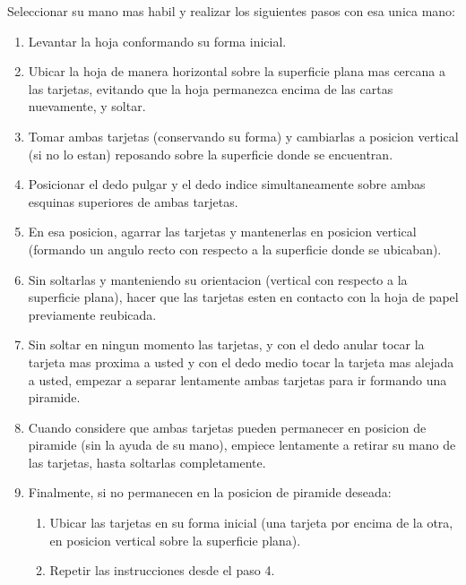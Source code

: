 \documentclass{article}
\begin{document}
Seleccionar su mano mas habil y realizar los siguientes pasos con esa unica mano:
\begin{enumerate}

    \item Levantar la hoja conformando su forma inicial.
    \item Ubicar la hoja de manera horizontal sobre la superficie plana mas cercana a las tarjetas, evitando que la hoja permanezca encima de las cartas nuevamente, y soltar.
    \item Tomar ambas tarjetas (conservando su forma) y cambiarlas a posicion vertical (si no lo estan) reposando sobre la superficie donde se encuentran.
    \item Posicionar el dedo pulgar y el dedo indice simultaneamente sobre ambas esquinas superiores de ambas tarjetas.
    \item En esa posicion, agarrar las tarjetas y mantenerlas en posicion vertical (formando un angulo recto con respecto a la superficie donde se ubicaban).
    \item Sin soltarlas y manteniendo su orientacion (vertical con respecto a la superficie plana), hacer que las tarjetas esten en contacto con la hoja de papel previamente reubicada.
    \item Sin soltar en ningun momento las tarjetas, y con el dedo anular tocar la tarjeta mas proxima a usted y con el dedo medio tocar la tarjeta mas alejada a usted, empezar a separar lentamente ambas tarjetas para ir formando una piramide.
    \item Cuando considere que ambas tarjetas pueden permanecer en posicion de piramide (sin la ayuda de su mano), empiece lentamente a retirar su mano de las tarjetas, hasta soltarlas completamente.
    \item Finalmente, si no permanecen en la posicion de piramide deseada:
    \begin{enumerate}
    
        \item Ubicar las tarjetas en su forma inicial (una tarjeta por encima de la otra, en posicion vertical sobre la superficie plana).
        \item Repetir las instrucciones desde el paso 4.
        
    \end{enumerate}
    
\end{enumerate}
\end{document}
